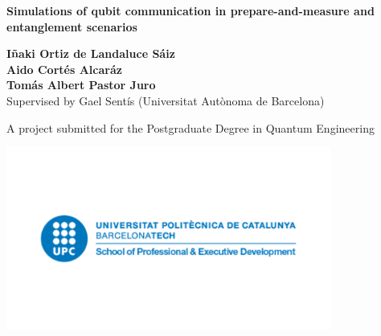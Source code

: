 \begin{titlepage}
   \begin{center}
       \vspace*{1cm}

       \Large
       \textbf{Simulations of qubit communication in prepare-and-measure and entanglement scenarios}

       \vspace{0.8cm}

       \normalsize
       \textbf{I\~{n}aki Ortiz de Landaluce S\'aiz\\Aido Cort\'es Alcar\'az\\Tom\'as Albert Pastor Juro\\}
       \vspace{0.5cm}
       \footnotesize{Supervised by Gael Sent\'is (Universitat Aut\`onoma de Barcelona)}
       \vfill
            
       \footnotesize{A project submitted for the Postgraduate Degree in Quantum Engineering}
            
       \includegraphics[width=0.8\textwidth]{images/upc.png}
            
       \date{\today}
            
   \end{center}
\end{titlepage}